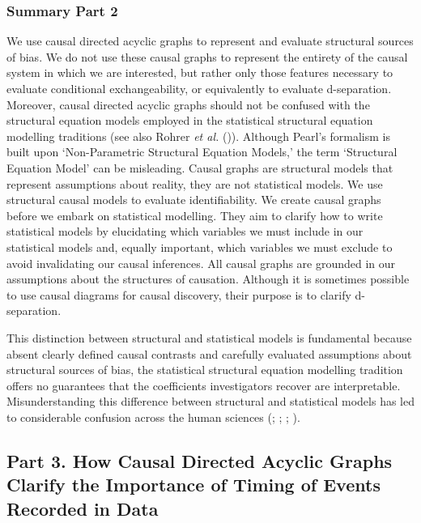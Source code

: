 \documentclass[
  single column]{article}
\begin{document}
\subsubsection{Summary Part 2}\label{summary-part-2}

We use causal directed acyclic graphs to represent and evaluate
structural sources of bias. We do not use these causal graphs to
represent the entirety of the causal system in which we are interested,
but rather only those features necessary to evaluate conditional
exchangeability, or equivalently to evaluate d-separation. Moreover,
causal directed acyclic graphs should not be confused with the
structural equation models employed in the statistical structural
equation modelling traditions (see also Rohrer \emph{et al.}
()). Although Pearl's formalism is
built upon `Non-Parametric Structural Equation Models,' the term
`Structural Equation Model' can be misleading. Causal graphs are
structural models that represent assumptions about reality, they are not
statistical models. We use structural causal models to evaluate
identifiability. We create causal graphs before we embark on statistical
modelling. They aim to clarify how to write statistical models by
elucidating which variables we must include in our statistical models
and, equally important, which variables we must exclude to avoid
invalidating our causal inferences. All causal graphs are grounded in
our assumptions about the structures of causation. Although it is
sometimes possible to use causal diagrams for causal discovery, their
purpose is to clarify d-separation.

This distinction between structural and statistical models is
fundamental because absent clearly defined causal contrasts and
carefully evaluated assumptions about structural sources of bias, the
statistical structural equation modelling tradition offers no guarantees
that the coefficients investigators recover are interpretable.
Misunderstanding this difference between structural and statistical
models has led to considerable confusion across the human sciences
(;
;
;
).

\subsection{Part 3. How Causal Directed Acyclic Graphs Clarify the
Importance of Timing of Events Recorded in Data}\label{id-sec-3}
\end{document}
